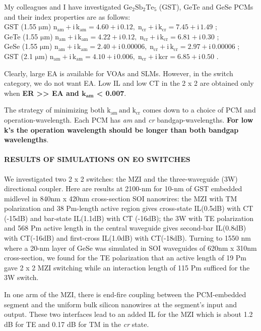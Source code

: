 \documentclass[]{article}
\let\oldparagraph\paragraph
\renewcommand{\paragraph}[1]{\oldparagraph{#1}\mbox{}}
\begin{document}
My colleagues and I have investigated \(\mathrm{Ge_2 Sb_2 Te_5}\) (GST),
GeTe and GeSe PCMs and their index properties are as follows:\\
GST (1.55 $\mathrm{\mu m}$)
\(\mathrm{n_{am} + i\,k_{am} = 4.60 + i\,0.12,\;n_{cr} + i\,k_{cr} = 7.45 + i\,1.49}\) ;\\
GeTe (1.55 $\mathrm{\mu m}$)
\(\mathrm{n_{am} + i\,k_{am} = 4.22 + i\,0.12,\;n_{cr} + i\,k_{cr} = 6.81 +i\,0.30}\) ;\\
GeSe (1.55 $\mathrm{\mu m}$)
\(\mathrm{n_{am} + i\,k_{am} = 2.40 + i\,0.00006,\;n_{cr} + i\,k_{cr} = 2.97 + i\,0.00006}\) ;\\
GST (2.1 $\mathrm{\mu m}$)
\(\mathrm{n_{am} + i\,k_{am} = 4.10 + i\,0.006,\;n_{cr} + i\,k{cr} = 6.85 + i\,0.50}\) .

Clearly, large EA is available for VOAs and SLMs. However, in the switch
category, we do not want EA. Low IL and low CT in the 2 x 2 are obtained
only when \textbf{ER \textgreater{}\textgreater{} EA and
\(\mathbf{k_{am}}\) \textless{} 0.007}.

\newpage
The strategy of minimizing both \(\mathrm{k_{am}\,and\;k_{cr}}\) comes
down to a choice of PCM and operation-wavelength. Each PCM has \emph{am}
and \emph{cr} bandgap-wavelengths. \textbf{For low k's the operation
wavelength should be longer than both bandgap wavelengths}.

\paragraph{RESULTS OF SIMULATIONS ON EO
SWITCHES}\label{results-of-simulations-on-eo-switches}

We investigated two 2 x 2 switches: the MZI and the three-waveguide (3W)
directional coupler. Here are results at 2100-nm for 10-nm of GST
embedded midlevel in 840nm x 420nm cross-section SOI nanowires: the MZI
with TM polarization and 38 Pm-length active region gives cross-state
IL(0.5dB) with CT\\(-15dB) and bar-state IL(1.1dB) with CT
(-16dB); the 3W with TE polarization and 568 Pm active length in the central waveguide
gives second-bar IL(0.8dB) with CT(-16dB) and first-cross IL(1.0dB) with
CT(-18dB). Turning to 1550 nm where a 20-nm layer of GeSe was simulated
in SOI waveguides of 620nm x 310nm cross-section, we found for the TE
polarization that an active length of 19 Pm gave 2 x 2 MZI switching
while an interaction length of 115 Pm sufficed for the 3W switch.

In one arm of the MZI, there is end-fire coupling between the
PCM-embedded segment and the uniform bulk silicon nanowires at the
segment's input and output. These two interfaces lead to an added IL for
the MZI which is about 1.2 dB for TE and 0.17 dB for TM in the \emph{cr}
state.
\end{document}

